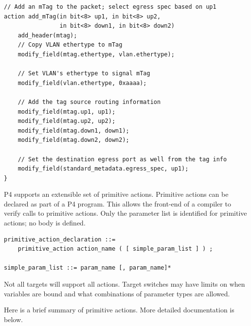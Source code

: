 \documentclass[12pt]{article}
\begin{document}
\begin{lstlisting}[style=P4style]
// Add an mTag to the packet; select egress spec based on up1
action add_mTag(in bit<8> up1, in bit<8> up2,
                in bit<8> down1, in bit<8> down2)
    add_header(mtag);
    // Copy VLAN ethertype to mTag
    modify_field(mtag.ethertype, vlan.ethertype);

    // Set VLAN's ethertype to signal mTag
    modify_field(vlan.ethertype, 0xaaaa);

    // Add the tag source routing information
    modify_field(mtag.up1, up1);
    modify_field(mtag.up2, up2);
    modify_field(mtag.down1, down1);
    modify_field(mtag.down2, down2);

    // Set the destination egress port as well from the tag info
    modify_field(standard_metadata.egress_spec, up1);
}
\end{lstlisting}


P4 supports an extensible set of primitive actions. Primitive actions can 
be declared as part of a P4 program. This allows the front-end of a compiler 
to verify calls to primitive actions. Only the parameter list is identified 
for primitive actions; no body is defined. 

\begin{lstlisting}[style=BNFstyle]
primitive_action_declaration ::= 
    primitive_action action_name ( [ simple_param_list ] ) ;

simple_param_list ::= param_name [, param_name]*
\end{lstlisting}

Not all targets will support all actions. Target switches may have
limits on when variables are bound and what combinations of parameter
types are allowed.

Here is a brief summary of primitive actions. More detailed documentation 
is below.
\end{document}
